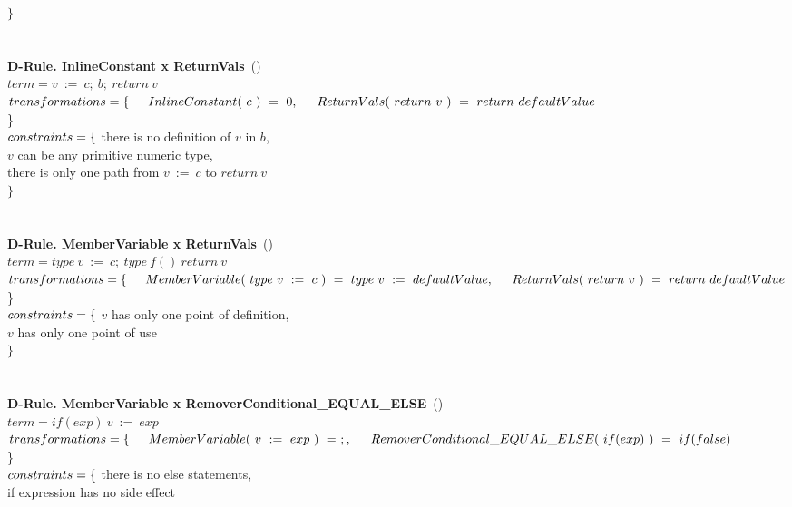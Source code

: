 $\}$\\
\\
\\
\textbf{D-Rule. InlineConstant x ReturnVals}~(\pit{})\\
$term = v~:=~c;~b;~return~v $\\
$transformations = \{\\ 
\indent InlineConstant(~c~)~=~0,\\ 
\indent ReturnVals(~return~v~)~=~return~defaultValue$\\\}\\
$constraints = \{ \\$ 
\indent there is no definition of $v$ in $b$, \\ 
\indent $v$ can be any primitive numeric type, \\
\indent there is only one path from $v~:=~c$ to $return~v$ \\
$\}$\\
\\
\\
\textbf{D-Rule. MemberVariable x ReturnVals}~(\pit{})\\
$term = type~v~:=~c;~type~f(){~return~v~} $\\
$transformations = \{\\ 
\indent MemberVariable(~type~v~:=~c~)~=~type~v~:=~defaultValue,\\ 
\indent ReturnVals(~return~v~)~=~return~defaultValue$\\\}\\
$constraints = \{ \\$ 
\indent $v$ has only one point of definition, \\
\indent $v$ has only one point of use \\
$\}$\\
\\
\\
\textbf{D-Rule. MemberVariable x RemoverConditional\_EQUAL\_ELSE}~(\pit{})\\
$term = if(exp){~v~:=~exp~}$\\
$transformations = \{\\ 
\indent MemberVariable(~v~:=~exp~)~=~;,\\ 
\indent RemoverConditional\_EQUAL\_ELSE(~if(exp)~)~=~if(false)$\\\}\\
$constraints = \{ \\$ 
\indent there is no else statements, \\ 
\indent if expression has no side effect \\
